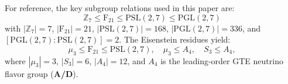 \documentclass[11pt]{article}
\theoremstyle{remark}
\newcommand{\PSLtwo}{\ensuremath{\mathrm{PSL}(2,7)}}
\newcommand{\PGLtwo}{\ensuremath{\mathrm{PGL}(2,7)}}
\newcommand{\FineSeven}{\ensuremath{\mathrm{F}_{21}}}
\newcommand{\Zcyc}[1]{\ensuremath{\mathbb{Z}_{#1}}}
\newcommand{\AltFour}{\ensuremath{A_4}}
\newcommand{\CatAD}{\textbf{A/D}}
\begin{document}
\begin{appendices}
For reference, the key subgroup relations used in this paper are:
\begin{equation}
  \Zcyc{7} \leq \FineSeven \leq \PSLtwo \leq \PGLtwo
\end{equation}
with $|\Zcyc{7}| = 7$, $|\FineSeven| = 21$, $|\PSLtwo| = 168$, $|\PGLtwo| = 336$,
and $[\PGLtwo : \PSLtwo] = 2$.
The Eisenstein residues yield:
\begin{equation}
  \mu_3 \leq \FineSeven \leq \PSLtwo, \quad
  \mu_3 \leq \AltFour, \quad
  S_3 \leq \AltFour,
\end{equation}
where $|\mu_3| = 3$, $|S_3| = 6$, $|\AltFour| = 12$, and $\AltFour$ is the
leading-order GTE neutrino flavor group (\CatAD).

\end{appendices}



\end{document}

